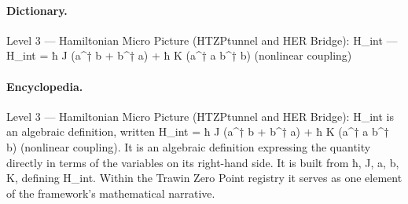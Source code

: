 \paragraph{Dictionary.}
Level 3 — Hamiltonian Micro Picture (HTZPtunnel and HER Bridge): H\_int — H\_int = ħ J (a\textasciicircum{}† b + b\textasciicircum{}† a) + ħ K (a\textasciicircum{}† a b\textasciicircum{}† b) (nonlinear coupling)

\paragraph{Encyclopedia.}
Level 3 — Hamiltonian Micro Picture (HTZPtunnel and HER Bridge): H\_int is an algebraic definition, written H\_int = ħ J (a\textasciicircum{}† b + b\textasciicircum{}† a) + ħ K (a\textasciicircum{}† a b\textasciicircum{}† b) (nonlinear coupling). It is an algebraic definition expressing the quantity directly in terms of the variables on its right-hand side. It is built from ħ, J, a, b, K, defining H\_int. Within the Trawin Zero Point registry it serves as one element of the framework's mathematical narrative.
